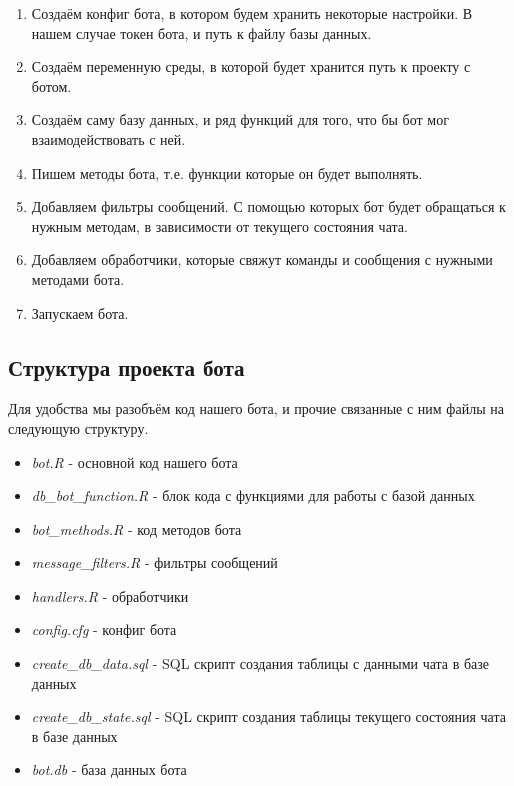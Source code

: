 \documentclass[
]{book}
\providecommand{\tightlist}{%
  \setlength{\itemsep}{0pt}\setlength{\parskip}{0pt}}
\begin{document}
\begin{enumerate}
\def\labelenumi{\arabic{enumi}.}
\tightlist
\item
  Создаём конфиг бота, в котором будем хранить некоторые настройки. В нашем случае токен бота, и путь к файлу базы данных.
\item
  Создаём переменную среды, в которой будет хранится путь к проекту с ботом.
\item
  Создаём саму базу данных, и ряд функций для того, что бы бот мог взаимодействовать с ней.
\item
  Пишем методы бота, т.е. функции которые он будет выполнять.
\item
  Добавляем фильтры сообщений. С помощью которых бот будет обращаться к нужным методам, в зависимости от текущего состояния чата.
\item
  Добавляем обработчики, которые свяжут команды и сообщения с нужными методами бота.
\item
  Запускаем бота.
\end{enumerate}

\subsection{Структура проекта бота}\label{ux441ux442ux440ux443ux43aux442ux443ux440ux430-ux43fux440ux43eux435ux43aux442ux430-ux431ux43eux442ux430}

Для удобства мы разобъём код нашего бота, и прочие связанные с ним файлы на следующую структуру.

\begin{itemize}
\tightlist
\item
  \emph{bot.R} - основной код нашего бота
\item
  \emph{db\_bot\_function.R} - блок кода с функциями для работы с базой данных
\item
  \emph{bot\_methods.R} - код методов бота
\item
  \emph{message\_filters.R} - фильтры сообщений
\item
  \emph{handlers.R} - обработчики
\item
  \emph{config.cfg} - конфиг бота
\item
  \emph{create\_db\_data.sql} - SQL скрипт создания таблицы с данными чата в базе данных
\item
  \emph{create\_db\_state.sql} - SQL скрипт создания таблицы текущего состояния чата в базе данных
\item
  \emph{bot.db} - база данных бота
\end{itemize}
\end{document}
